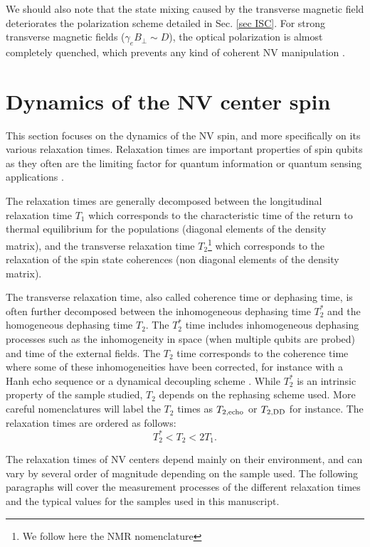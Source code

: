 \documentclass[a4paper,11pt]{report}
\begin{document}
\begin{refsection}
We should also note that the state mixing caused by the transverse magnetic field deteriorates the polarization scheme detailed in Sec. \ref{sec ISC}. For strong transverse magnetic fields ($\gamma_e B_\perp \sim D$), the optical polarization is almost completely quenched, which prevents any kind of coherent NV manipulation \citep{tetienne2012magnetic}.

\section{Dynamics of the NV center spin}

This section focuses on the dynamics of the NV spin, and more specifically on its various relaxation times. Relaxation times are important properties of spin qubits as they often are the limiting factor for quantum information or quantum sensing applications \citep{de2021materials, degen2017quantum}.

The relaxation times are generally decomposed between the longitudinal relaxation time $T_1$ which corresponds to the characteristic time of the return to thermal equilibrium for the populations (diagonal elements of the density matrix), and the transverse relaxation time $T_2$\footnote{We follow here the NMR nomenclature} which corresponds to the relaxation of the spin state coherences (non diagonal elements of the density matrix).

The transverse relaxation time, also called coherence time or dephasing time, is often further decomposed between the inhomogeneous dephasing time $T_2^*$ and the homogeneous dephasing time $T_2$. The $T_2^*$ time includes inhomogeneous dephasing processes such as the inhomogeneity in space (when multiple qubits are probed) and time of the external fields. The $T_2$ time corresponds to the coherence time where some of these inhomogeneities have been corrected, for instance with a Hanh echo sequence \citep{hahn1950spin} or a dynamical decoupling scheme \citep{naydenov2011dynamical}. While $T_2^*$ is an intrinsic property of the sample studied, $T_2$ depends on the rephasing scheme used. More careful nomenclatures will label the $T_2$ times as $T_{2,\rm echo}$ or $T_{2,\rm DD}$ \citep{de2021materials} for instance. The relaxation times are ordered as follows:
\begin{equation}
T_2^* < T_2 < 2 T_1.
\end{equation}

The relaxation times of NV centers depend mainly on their environment, and can vary by several order of magnitude depending on the sample used. The following paragraphs will cover the measurement processes of the different relaxation times and the typical values for the samples used in this manuscript.


\end{refsection}
\end{document}
